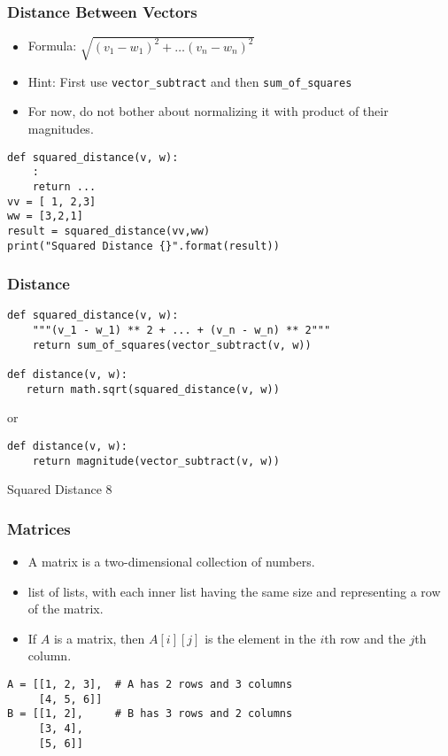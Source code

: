 \begin{frame}[fragile]\frametitle{Distance Between Vectors}
\begin{itemize}
\item  Formula:
$ \sqrt{(v_1 - w_1)^2 + \ldots (v_n - w_n)^2}$
\item Hint: First use \lstinline|vector_subtract| and then \lstinline|sum_of_squares|
\item For now, do not bother about normalizing it with product of their magnitudes.

\end{itemize}
\begin{lstlisting}
def squared_distance(v, w):
	:
	return ...
vv = [ 1, 2,3]
ww = [3,2,1]
result = squared_distance(vv,ww)
print("Squared Distance {}".format(result))
\end{lstlisting}
\end{frame}

\begin{frame}[fragile]\frametitle{Distance}

\begin{lstlisting}
def squared_distance(v, w):
    """(v_1 - w_1) ** 2 + ... + (v_n - w_n) ** 2"""
    return sum_of_squares(vector_subtract(v, w))
    
def distance(v, w):
   return math.sqrt(squared_distance(v, w))
\end{lstlisting}
or
\begin{lstlisting}
def distance(v, w):
    return magnitude(vector_subtract(v, w))
\end{lstlisting}
Squared Distance 8
\end{frame}

\begin{frame}[fragile]\frametitle{Matrices}
\begin{itemize}
\item  A matrix is a two-dimensional collection of numbers. 
\item list of  lists, with each inner list having the same size and representing a row of the
matrix.
\item  If  $A$  is a matrix, then  $A[i][j]$  is the element in the $i$th row and the $j$th column.
\end{itemize}
\begin{lstlisting}
A = [[1, 2, 3],  # A has 2 rows and 3 columns
     [4, 5, 6]]
B = [[1, 2],     # B has 3 rows and 2 columns
     [3, 4],
     [5, 6]]
\end{lstlisting}
\end{frame}


